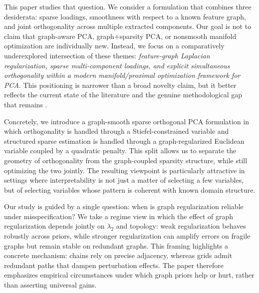 \documentclass[10pt,twocolumn,letterpaper]{article}
\theoremstyle{definition}
\begin{document}
This paper studies that question. We consider a formulation that combines three desiderata: sparse loadings, smoothness with respect to a known feature graph, and joint orthogonality across multiple extracted components. Our goal is not to claim that graph-aware PCA, graph+sparsity PCA, or nonsmooth manifold optimization are individually new. Instead, we focus on a comparatively underexplored intersection of these themes: \emph{feature-graph Laplacian regularization, sparse multi-component loadings, and explicit simultaneous orthogonality within a modern manifold/proximal optimization framework for PCA}. This positioning is narrower than a broad novelty claim, but it better reflects the current state of the literature and the genuine methodological gap that remains \cite{briola2026grpca,feng2019glspca,wu2019gdspca,chen2020amanpg}.

Concretely, we introduce a graph-smooth sparse orthogonal PCA formulation in which orthogonality is handled through a Stiefel-constrained variable and structured sparse estimation is handled through a graph-regularized Euclidean variable coupled by a quadratic penalty. This split allows us to separate the geometry of orthogonality from the graph-coupled sparsity structure, while still optimizing the two jointly. The resulting viewpoint is particularly attractive in settings where interpretability is not just a matter of selecting a few variables, but of selecting variables whose pattern is coherent with known domain structure.

Our study is guided by a single question: when is graph regularization reliable under misspecification? We take a regime view in which the effect of graph regularization depends jointly on $\lambda_2$ and topology: weak regularization behaves robustly across priors, while stronger regularization can amplify errors on fragile graphs but remain stable on redundant graphs. This framing highlights a concrete mechanism: chains rely on precise adjacency, whereas grids admit redundant paths that dampen perturbation effects. The paper therefore emphasizes empirical circumstances under which graph priors help or hurt, rather than asserting universal gains.
\end{document}
